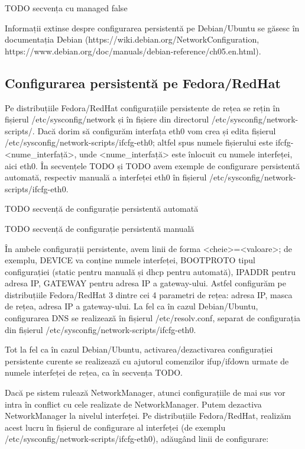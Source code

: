 TODO secvența cu managed false

Informații extinse despre configurarea persistentă pe Debian/Ubuntu se găsesc în documentația Debian (https://wiki.debian.org/NetworkConfiguration, https://www.debian.org/doc/manuals/debian-reference/ch05.en.html).

\subsection{Configurarea persistentă pe Fedora/RedHat}
\label{sec:net:persistent-config-redhat}

Pe distribuțiile Fedora/RedHat configurațiile persistente de rețea se rețin în fișierul /etc/sysconfig/network și în fișiere din directorul /etc/sysconfig/network-scripts/. Dacă dorim să configurăm interfața eth0 vom crea și edita fișierul /etc/sysconfig/network-scripts/ifcfg-eth0; altfel spus numele fișierului este ifcfg-<nume_interfață>, unde <nume_interfață> este înlocuit cu numele interfeței, aici eth0. În secvențele TODO și TODO avem exemple de configurare persistentă automată, respectiv manuală a interfeței eth0 în fișierul /etc/sysconfig/network-scripts/ifcfg-eth0.

TODO secvență de configurație persistentă automată

TODO secvență de configurație persistentă manuală

În ambele configurații persistente, avem linii de forma <cheie>=<valoare>; de exemplu, DEVICE va conține numele interfeței, BOOTPROTO tipul configurației (static pentru manuală și dhcp pentru automată), IPADDR pentru adresa IP, GATEWAY pentru adresa IP a gateway-ului. Astfel configurăm pe distribuțiile Fedora/RedHat 3 dintre cei 4 parametri de rețea: adresa IP, masca de rețea, adresa IP a gateway-ului. La fel ca în cazul Debian/Ubuntu, configurarea DNS se realizează în fișierul /etc/resolv.conf, separat de configurația din fișierul /etc/sysconfig/network-scripts/ifcfg-eth0.

Tot la fel ca în cazul Debian/Ubuntu, activarea/dezactivarea configurației persistente curente se realizează cu ajutorul comenzilor ifup/ifdown urmate de numele interfeței de rețea, ca în secvența TODO.

Dacă pe sistem rulează NetworkManager, atunci configurațiile de mai sus vor intra în conflict cu cele realizate de NetworkManager. Putem dezactiva NetworkManager la nivelul interfeței. Pe distribuțiile Fedora/RedHat, realizăm acest lucru în fișierul de configurare al interfeței (de exemplu /etc/sysconfig/network-scripts/ifcfg-eth0), adăugând linii de configurare:

